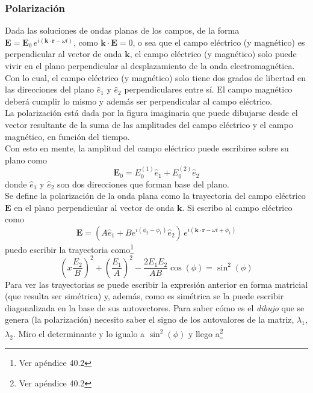 

\subsubsection{Polarización}
Dada las soluciones de ondas planas de los campos, de la forma $\textbf{E} = \textbf{E}_{0}\,e^{i(\textbf{k}\cdot \textbf{r} - \omega t)}$, como $\textbf{k}\cdot \textbf{E} = 0$, o sea que el campo eléctrico (y magnético) es perpendicular al vector de onda $\textbf{k}$, el campo eléctrico (y magnético) solo puede vivir en el plano perpendicular al desplazamiento de la onda electromagnética. Con lo cual, el campo eléctrico (y magnético) solo tiene dos grados de libertad en las direcciones del plano $\hat{e}_{1}$ y $\hat{e}_{2}$ perpendiculares entre sí. El campo magnético deberá cumplir lo mismo y además ser perpendicular al campo eléctrico.\\
\indent La polarización está dada por la figura imaginaria que puede dibujarse desde el vector resultante de la suma de las amplitudes del campo eléctrico y el campo magnético, en función del tiempo.\\
\indent Con esto en mente, la amplitud del campo eléctrico puede escribirse sobre su plano como
\begin{equation*}
    \textbf{E}_{0} = E_{0}^{(1)}\hat{e}_{1} + E_{0}^{(2)}\hat{e}_{2}
\end{equation*}
donde $\hat{e}_{1}$ y $\hat{e}_{2}$ son dos direcciones que forman base del plano.\\
\indent Se define la polarización de la onda plana como la trayectoria del campo eléctrico $\textbf{E}$ en el plano perpendicular al vector de onda $\textbf{k}$. Si escribo al campo eléctrico como
\begin{equation*}
    \textbf{E} = 
    \left(
        A\hat{e}_{1} + Be^{i(\phi_{2}-\phi_{1})}\hat{e}_{2}
    \right)\,e^{i(\textbf{k}\cdot\textbf{r} - \omega t + \phi_{1})}
\end{equation*}
puedo escribir la trayectoria como\footnote{Ver apéndice 40.2}
\begin{equation*}
    \left(x
        \frac{E_{2}}{B}
    \right)^{2}
    +
    \left(
        \frac{E_{1}}{A}
    \right)^{2}
    -\frac{2E_{1}E_{2}}{AB}\cos{(\phi)}
    = \sin^{2}{(\phi)}
\end{equation*}
Para ver las trayectorias se puede escribir la expresión anterior en forma matricial (que resulta ser simétrica) y, además, como es simétrica se la puede escribir diagonalizada en la base de sus autovectores.  Para saber cómo es el \textit{dibujo} que se genera (la polarización) necesito saber el signo de los autovalores de la matriz, $\lambda_{1}$, $\lambda_{2}$. Miro el determinante y lo igualo a $\sin^{2}{(\phi)}$ y llego a\footnote{Ver apéndice 40.2}
